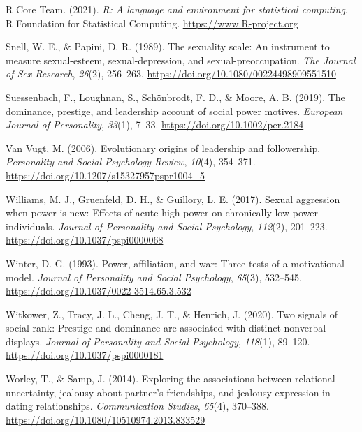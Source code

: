 \documentclass[
  english,
  a4paper,floatsintext]{apa7}
\newlength{\cslhangindent}
\newlength{\cslentryspacingunit} %
\newenvironment{CSLReferences}[2] %
 {%
  \setlength{\parindent}{0pt}
  \ifodd #1
  \let\oldpar\par
  \def\par{\hangindent=\cslhangindent\oldpar}
  \fi
  \setlength{\parskip}{#2\cslentryspacingunit}
 }%
 {}
\begin{document}
\begin{CSLReferences}{1}{0}
\leavevmode{}%
R Core Team. (2021). \emph{R: A language and environment for statistical computing}. R Foundation for Statistical Computing. \url{https://www.R-project.org}

\leavevmode{}%
Snell, W. E., \& Papini, D. R. (1989). The sexuality scale: An instrument to measure sexual-esteem, sexual-depression, and sexual-preoccupation. \emph{The Journal of Sex Research}, \emph{26}(2), 256--263. \url{https://doi.org/10.1080/00224498909551510}

\leavevmode{}%
Suessenbach, F., Loughnan, S., Schönbrodt, F. D., \& Moore, A. B. (2019). The dominance, prestige, and leadership account of social power motives. \emph{European Journal of Personality}, \emph{33}(1), 7--33. \url{https://doi.org/10.1002/per.2184}

\leavevmode{}%
Van Vugt, M. (2006). Evolutionary origins of leadership and followership. \emph{Personality and Social Psychology Review}, \emph{10}(4), 354--371. \url{https://doi.org/10.1207/s15327957pspr1004_5}

\leavevmode{}%
Williams, M. J., Gruenfeld, D. H., \& Guillory, L. E. (2017). Sexual aggression when power is new: Effects of acute high power on chronically low-power individuals. \emph{Journal of Personality and Social Psychology}, \emph{112}(2), 201--223. \url{https://doi.org/10.1037/pspi0000068}

\leavevmode{}%
Winter, D. G. (1993). Power, affiliation, and war: Three tests of a motivational model. \emph{Journal of Personality and Social Psychology}, \emph{65}(3), 532--545. \url{https://doi.org/10.1037/0022-3514.65.3.532}

\leavevmode{}%
Witkower, Z., Tracy, J. L., Cheng, J. T., \& Henrich, J. (2020). Two signals of social rank: Prestige and dominance are associated with distinct nonverbal displays. \emph{Journal of Personality and Social Psychology}, \emph{118}(1), 89--120. \url{https://doi.org/10.1037/pspi0000181}

\leavevmode{}%
Worley, T., \& Samp, J. (2014). Exploring the associations between relational uncertainty, jealousy about partner's friendships, and jealousy expression in dating relationships. \emph{Communication Studies}, \emph{65}(4), 370--388. \url{https://doi.org/10.1080/10510974.2013.833529}

\end{CSLReferences}
\end{document}
